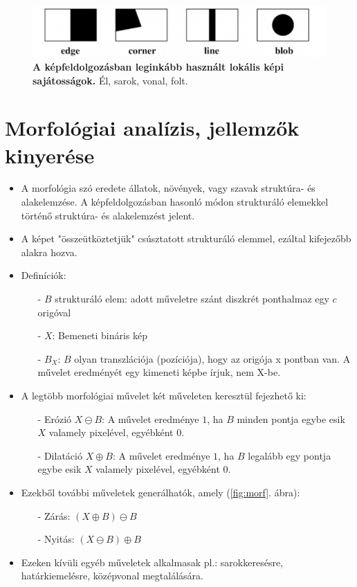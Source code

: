 \documentclass[12pt]{article}
\theoremstyle{plain}
\begin{document}
\begin{figure}[H]
    \begin{center}
    \includegraphics[width=0.75\linewidth]{media/edges.png}
    \caption{\textbf{A képfeldolgozásban leginkább használt lokális képi sajátosságok.} Él, sarok, vonal, folt.} 
    \label{fig:edges}
    \end{center}
\end{figure}

\section{Morfológiai analízis, jellemzők kinyerése}

\begin{itemize}
    \item A morfológia szó eredete állatok, növények, vagy szavak struktúra- és alakelemzése. A képfeldolgozásban hasonló módon strukturáló elemekkel történő struktúra- és alakelemzést jelent.
    \item A képet "összeütköztetjük" csúsztatott strukturáló elemmel, ezáltal kifejezőbb alakra hozva.
    \item Definíciók:
    \begin{itemize}
        \item[-] $B$ strukturáló elem: adott műveletre szánt diszkrét ponthalmaz egy $c$ origóval
        \item[-] $X$: Bemeneti bináris kép
        \item[-] $B_X$: $B$ olyan transzlációja (pozíciója), hogy az origója x pontban van. A művelet eredményét egy kimeneti képbe írjuk, nem X-be.
    \end{itemize}{}
    \item A legtöbb morfológiai művelet két műveleten keresztül fejezhető ki:
     \begin{itemize}
        \item[-] Erózió $X\ominus B$: A művelet eredménye $1$, ha $B$ minden pontja egybe esik $X$ valamely pixelével, egyébként 0.
        \item[-] Dilatáció $X\oplus B$: A művelet eredménye $1$, ha $B$ legalább egy pontja egybe esik $X$ valamely pixelével, egyébként 0.
    \end{itemize}{}
    \item Ezekből további műveletek generálhatók, amely (\ref{fig:morf}. ábra):
    \begin{itemize}
        \item[-] Zárás: $(X\oplus B) \ominus B$
        \item[-] Nyitás: $(X\ominus B) \oplus B$
    \end{itemize}{}   
    \item Ezeken kívüli egyéb műveletek alkalmasak pl.: sarokkeresésre, határkiemelésre, középvonal megtalálására.
\end{itemize}{}
\end{document}
